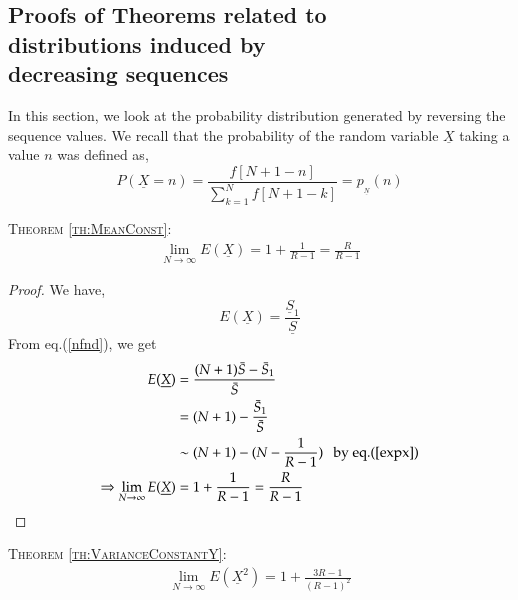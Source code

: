 \begin{multicols}{2}
\newpage

\section{Proofs of Theorems related to\\ distributions induced by\\ decreasing sequences}\label{section-7}

In this section, we look at the probability distribution generated by reversing the sequence values. We recall that the probability of the random variable $\underline{X}$ taking a value $n$ was defined as, 
\begin{equation}
P(\underline{X} = n) =\frac{f[N+1-n]}{\displaystyle{\sum_{k=1}^{N}f[N+1-k]}} = p_{_{\underline{N}}}(n)\label{eq-7.1}
\end{equation}

\vspace{-.6cm}

\textsc{Theorem {\ref{th:MeanConst}}:}
\begin{eqnarray*}
\displaystyle{\lim_{N \rightarrow \infty}}E(\underline{X}) = 1 + \displaystyle{\frac{1}{R-1}} =  \displaystyle{\frac{R}{R-1}}
\end{eqnarray*}

\vspace{-.5cm}

\begin{proof}\renewcommand{\qedsymbol}{}
We have,
\begin{equation}
E(\underline{X}) = \frac{\underline{S}_1}{\underline{S}}
\end{equation}
From eq.(\ref{nfnd}), we get
\begin{align}
E(\underline{X}) &= \frac{(N+1)\bar{S} - \bar{S}_1}{\bar{S}}\nonumber\\
&= (N+1) - \frac{\bar{S}_1}{\bar{S}}\nonumber\\
&\sim (N+1) - (N - \frac{1}{R-1}) \hspace{0.1in}\textup{by eq.(\ref{expx}})\nonumber\\
\Rightarrow  \lim_{N\rightarrow \infty}E(\underline{X}) &= 1 + \displaystyle{\frac{1}{R-1}} = \displaystyle{\frac{R}{R-1}}\label{eq-7.3}
\end{align}
\end{proof}

\vspace{-.8cm}

\textsc{Theorem {\ref{th:VarianceConstantY}}:}
\begin{eqnarray*}
\displaystyle{\lim_{N \rightarrow \infty}}E(\underline{X}^2) = 1 + \displaystyle{\frac{3R-1}{(R-1)^2}}
\end{eqnarray*}


\end{multicols}
